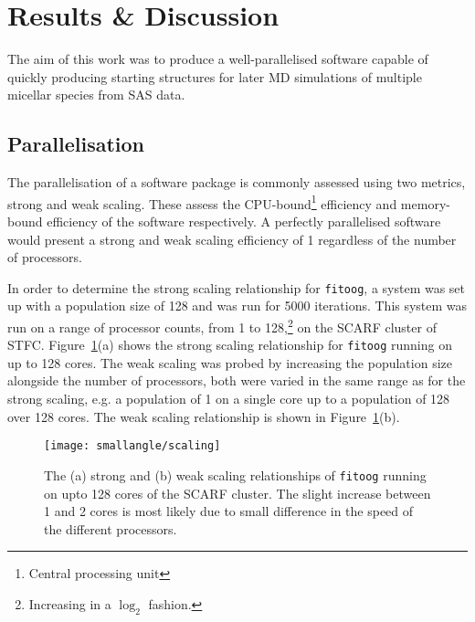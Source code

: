 \section{Results \& Discussion}
The aim of this work was to produce a well-parallelised software capable of quickly producing starting structures for later MD simulations of multiple micellar species from SAS data.

\subsection{Parallelisation}
The parallelisation of a software package is commonly assessed using two metrics, strong and weak scaling.
These assess the CPU-bound\footnote{Central processing unit} efficiency and memory-bound efficiency of the software respectively.
A perfectly parallelised software would present a strong and weak scaling efficiency of 1 regardless of the number of processors.

In order to determine the strong scaling relationship for \texttt{fitoog}, a system was set up with a population size of 128 and was run for 5000 iterations.
This system was run on a range of processor counts, from 1 to 128,\footnote{Increasing in a $\log_2$ fashion.} on the SCARF cluster of STFC.
Figure~\ref{fig:scale}(a) shows the strong scaling relationship for \texttt{fitoog} running on up to 128 cores.
The weak scaling was probed by increasing the population size alongside the number of processors, both were varied in the same range as for the strong scaling, e.g. a population of 1 on a single core up to a population of 128 over 128 cores.
The weak scaling relationship is shown in Figure~\ref{fig:scale}(b).
%
\begin{figure}[t]
    \centering
    \texttt{[image: smallangle/scaling]}
    \caption{The (a) strong and (b) weak scaling relationships of \texttt{fitoog} running on upto 128 cores of the SCARF cluster. The slight increase between \num{1} and \num{2} cores is most likely due to small difference in the speed of the different processors.}
    \label{fig:scale}
\end{figure}
%

